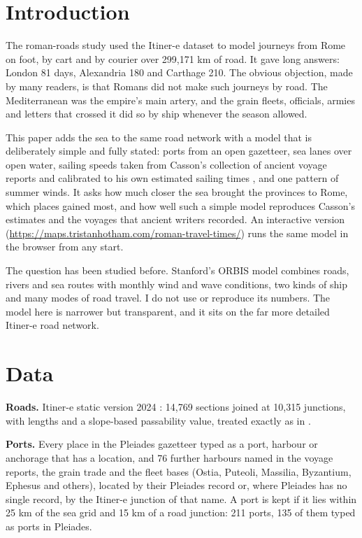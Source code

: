 \documentclass[11pt,a4paper]{article}
\begin{document}
\section{Introduction}
The roman-roads study \citep{hotham2026} used the Itiner-e dataset \citep{itinere,desoto2025} to model journeys from Rome on foot, by cart and by courier over 299,171 km of road. It gave long answers: London 81 days, Alexandria 180 and Carthage 210. The obvious objection, made by many readers, is that Romans did not make such journeys by road. The Mediterranean was the empire's main artery, and the grain fleets, officials, armies and letters that crossed it did so by ship whenever the season allowed.

This paper adds the sea to the same road network with a model that is deliberately simple and fully stated: ports from an open gazetteer, sea lanes over open water, sailing speeds taken from Casson's collection of ancient voyage reports and calibrated to his own estimated sailing times \citep{casson1951}, and one pattern of summer winds. It asks how much closer the sea brought the provinces to Rome, which places gained most, and how well such a simple model reproduces Casson's estimates and the voyages that ancient writers recorded. An interactive version (\url{https://maps.tristanhotham.com/roman-travel-times/}) runs the same model in the browser from any start.

The question has been studied before. Stanford's ORBIS model \citep{orbis,scheidel2014,scheidel2015} combines roads, rivers and sea routes with monthly wind and wave conditions, two kinds of ship and many modes of road travel. I do not use or reproduce its numbers. The model here is narrower but transparent, and it sits on the far more detailed Itiner-e road network.

\section{Data}
\textbf{Roads.} Itiner-e static version 2024 \citep{itinere}: 14,769 sections joined at 10,315 junctions, with lengths and a slope-based passability value, treated exactly as in \citet{hotham2026}.

\textbf{Ports.} Every place in the Pleiades gazetteer \citep{pleiades} typed as a port, harbour or anchorage that has a location, and 76 further harbours named in the voyage reports, the grain trade and the fleet bases (Ostia, Puteoli, Massilia, Byzantium, Ephesus and others), located by their Pleiades record or, where Pleiades has no single record, by the Itiner-e junction of that name. A port is kept if it lies within 25 km of the sea grid and 15 km of a road junction: 211 ports, 135 of them typed as ports in Pleiades.
\end{document}
